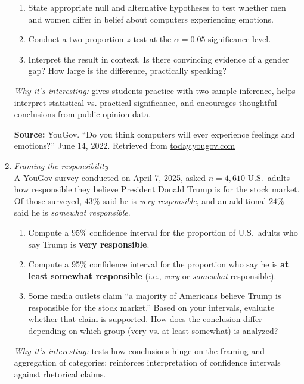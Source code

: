\documentclass[11pt]{article}
\begin{document}
\begin{enumerate}[label=\textbf{Q\,\arabic*:}, left=0pt]
      \begin{enumerate}[label=(\alph*)]
         \item State appropriate null and alternative hypotheses to test whether men and women differ in belief about computers experiencing emotions.
         \item Conduct a two-proportion $z$-test at the $\alpha = 0.05$ significance level.
         \item Interpret the result in context. Is there convincing evidence of a gender gap? How large is the difference, practically speaking?
      \end{enumerate}
      \textit{Why it’s interesting:} gives students practice with two-sample inference, helps interpret statistical vs. practical significance, and encourages thoughtful conclusions from public opinion data.

      \vspace{0.5em}
      \noindent\textbf{Source:} YouGov. “Do you think computers will ever experience feelings and emotions?” June 14, 2022. Retrieved from \href{https://today.yougov.com/}{today.yougov.com}


\item  \emph{Framing the responsibility} \\
      A YouGov survey conducted on April 7, 2025, asked $n = 4{,}610$ U.S.\ adults how responsible they believe President Donald Trump is for the stock market. Of those surveyed, $43\%$ said he is \emph{very responsible}, and an additional $24\%$ said he is \emph{somewhat responsible}.
      \begin{enumerate}[label=(\alph*)]
         \item Compute a 95\% confidence interval for the proportion of U.S.\ adults who say Trump is \textbf{very responsible}.
         \item Compute a 95\% confidence interval for the proportion who say he is \textbf{at least somewhat responsible} (i.e., \emph{very} or \emph{somewhat} responsible).
         \item Some media outlets claim “a majority of Americans believe Trump is responsible for the stock market.” Based on your intervals, evaluate whether that claim is supported. How does the conclusion differ depending on which group (very vs. at least somewhat) is analyzed?
      \end{enumerate}
      \textit{Why it’s interesting:} tests how conclusions hinge on the framing and aggregation of categories; reinforces interpretation of confidence intervals against rhetorical claims.


\end{enumerate}
\end{document}
